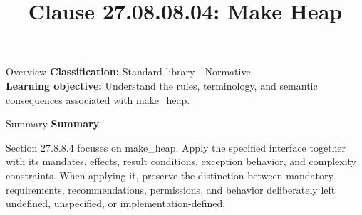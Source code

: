 \documentclass[10pt,letterpaper]{article}
\title{Clause 27.08.08.04: Make Heap}
\author{}
\date{}
\begin{document}
\maketitle
\begin{CornellOverviewBox}{Overview}
\textbf{Classification:} Standard library - Normative\\[2pt]
\textbf{Learning objective:} Understand the rules, terminology, and semantic consequences associated with make\_heap.
\end{CornellOverviewBox}\begin{CornellSummaryBox}{Summary}
{\sffamily\bfseries\color{Accent} Summary}\par\vspace{3pt}Section 27.8.8.4 focuses on make\_heap. Apply the specified interface together with its mandates, effects, result conditions, exception behavior, and complexity constraints. When applying it, preserve the distinction between mandatory requirements, recommendations, permissions, and behavior deliberately left undefined, unspecified, or implementation-defined.
\end{CornellSummaryBox}
\end{document}
